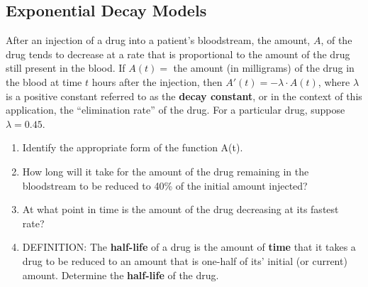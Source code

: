 \subsection*{Exponential Decay Models}
\begin{example}
After an injection of a drug into a patient’s bloodstream, the amount, $A$, of the drug tends to decrease at a rate that is proportional to the amount of the drug still present in the blood.  If $A(t)=$ the amount (in milligrams) of the drug in the blood at time $t$ hours after the injection, then $A'(t)=-\lambda\cdot A(t)$, where $\lambda$ is a positive constant referred to as the \textbf{decay constant}, or in the context of this application, the “elimination rate” of the drug.  For a particular drug, suppose $\lambda=0.45$.
\renewcommand{\labelenumi}{\textbf{(\alph{enumi})}}
\begin{enumerate}[leftmargin=*]
\item Identify the appropriate form of the function A(t). 
\item How long will it take for the amount of the drug remaining in the bloodstream to be reduced to 40\% of the initial amount injected?   
\item At what point in time is the amount of the drug decreasing at its fastest rate?      
\newpage
\item DEFINITION:  The \textbf{half-life} of a drug is the amount of \textbf{time} that it takes a drug to be reduced to an amount that is one-half of its’ initial (or current) amount. Determine the \textbf{half-life} of the drug.\\ 


\end{enumerate}
\end{example}
